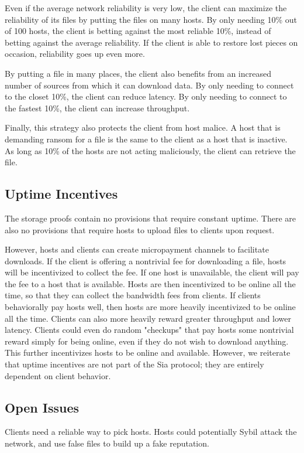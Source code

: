\documentclass[twocolumn]{article}
\begin{document}
Even if the average network reliability is very low, the client can maximize the reliability of its files by putting the files on many hosts.
By only needing 10\% out of 100 hosts, the client is betting against the most reliable 10\%, instead of betting against the average reliability.
If the client is able to restore lost pieces on occasion, reliability goes up even more.

By putting a file in many places, the client also benefits from an increased number of sources from which it can download data.
By only needing to connect to the closet 10\%, the client can reduce latency.
By only needing to connect to the fastest 10\%, the client can increase throughput.

Finally, this strategy also protects the client from host malice.
A host that is demanding ransom for a file is the same to the client as a host that is inactive.
As long as 10\% of the hosts are not acting maliciously, the client can retrieve the file.

\subsection{Uptime Incentives}
The storage proofs contain no provisions that require constant uptime.
There are also no provisions that require hosts to upload files to clients upon request.

However, hosts and clients can create micropayment channels to facilitate downloads.
If the client is offering a nontrivial fee for downloading a file, hosts will be incentivized to collect the fee.
If one host is unavailable, the client will pay the fee to a host that is available.
Hosts are then incentivized to be online all the time, so that they can collect the bandwidth fees from clients.
If clients behaviorally pay hosts well, then hosts are more heavily incentivized to be online all the time.
Clients can also more heavily reward greater throughput and lower latency.
Clients could even do random "checkups" that pay hosts some nontrivial reward simply for being online, even if they do not wish to download anything.
This further incentivizes hosts to be online and available.
However, we reiterate that uptime incentives are not part of the Sia protocol; they are entirely dependent on client behavior.

\subsection{Open Issues}
Clients need a reliable way to pick hosts.
Hosts could potentially Sybil attack the network, and use false files to build up a fake reputation.
\end{document}
